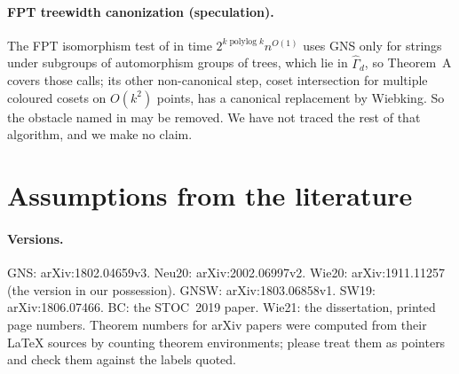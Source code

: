 \documentclass[11pt]{article}
\theoremstyle{plain}
\theoremstyle{definition}
\theoremstyle{remark}
\theoremstyle{named}
\theoremstyle{namedrm}
\newcommand{\polylog}{\operatorname{polylog}}
\newcommand{\Gd}{\widehat{\Gamma}_d}
\begin{document}
\paragraph{FPT treewidth canonization (speculation).} The FPT isomorphism test of \cite{GNSW} in time
$2^{k\polylog k}n^{O(1)}$ uses GNS only for strings under subgroups of automorphism groups of trees, which lie in
$\Gd$, so Theorem~A covers those calls; its other non-canonical step, coset intersection for multiple coloured
cosets on $O(k^2)$ points, has a canonical replacement by Wiebking. So the obstacle named in
\cite[p.~10]{Wie21} may be removed. We have not traced the rest of that algorithm, and we make no claim.

\section{Assumptions from the literature}\label{sec:assumptions}

\paragraph{Versions.} GNS: arXiv:1802.04659v3. Neu20: arXiv:2002.06997v2. Wie20: arXiv:1911.11257 (the
version in our possession). GNSW: arXiv:1803.06858v1. SW19: arXiv:1806.07466. BC: the STOC~2019 paper.
Wie21: the dissertation, printed page numbers. Theorem numbers for arXiv papers were computed from their
\LaTeX{} sources by counting theorem environments; please treat them as pointers and check them against the
labels quoted.
\end{document}
